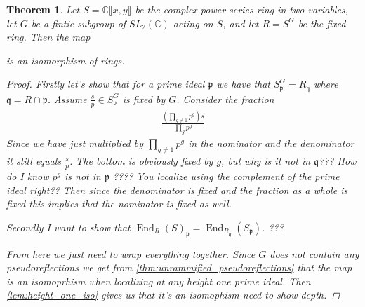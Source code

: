 \documentclass[11pt, a4paper, english]{article}
\numberwithin{prop}{section}
\numberwithin{lemma}{section}
\newtheorem{theorem}{Theorem}
\numberwithin{theorem}{section}
\numberwithin{defin}{section}
\numberwithin{example}{section}
\newcommand{\C}{\mathbb{C}}
\DeclareMathOperator{\End}{End}
\begin{document}
\begin{theorem}
Let $S = \C \llbracket x, y \rrbracket$ be the complex power series ring in two variables, let $G$ be  a fintie subgroup of $SL_2(\C)$ acting on $S$, and let $R = S^G$ be the fixed ring. Then the map
\begin{center}
\end{center}
is an isomorphism of rings.
\begin{proof}
Firstly let's show that for a prime ideal $\mathfrak{p}$ we have that $S_\mathfrak{p}^G = R_\mathfrak{q}$ where $\mathfrak{q} = R \cap \mathfrak{p}$. Assume $\frac{s}{p} \in S_\mathfrak{p}^G$ is fixed by $G$. Consider the fraction
\begin{align*}
\frac{ \left( \prod_{g \neq 1} p^g \right) s}{\prod_g p^g}
\end{align*}
Since we have just multiplied by $\prod_{g \neq 1} p^g$ in the nominator and the denominator it still equals $\frac{s}{p}$. The bottom is obviously fixed by $g$, but why is it not in $\mathfrak{q}$??? 
{\color{red} How do I know $p^g$ is not in $\mathfrak{p}$ ???? You localize using the complement of the prime ideal right??} Then since the denominator is fixed and the fraction as a whole is fixed this implies that the nominator is fixed as well.

Secondly I want to show that $\End_R(S)_\mathfrak{p} = \End_{R_\mathfrak{q}}(S_\mathfrak{p})$. {\color{red} ???}

From here we just need to wrap everything together. Since $G$ does not contain any pseudoreflections we get from \cref{thm:unrammified_pseudoreflections} that the map is an isomoprhism when localizing at any height one prime ideal. Then \cref{lem:height_one_iso} gives us that it's an isomophism {\color{red} need to show depth}.
\end{proof}
\end{theorem}
\end{document}
